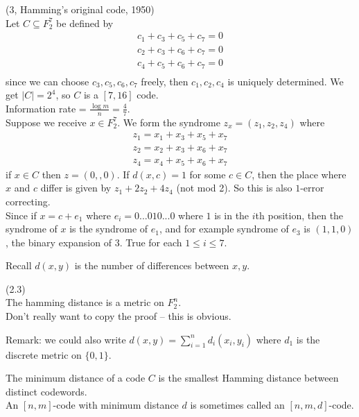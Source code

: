 \documentclass[a4paper]{article}
\begin{document}
\begin{eg} (3, Hamming's original code, 1950)\\
Let $C \subseteq F_2^7$ be defined by\\
\begin{equation*}
\begin{aligned}
c_1+c_3+c_5+c_7=0\\
c_2+c_3+c_6+c_7=0\\
c_4+c_5+c_6+c_7=0\\
\end{aligned}
\end{equation*}
since we can choose $c_3,c_5,c_6,c_7$ freely, then $c_1,c_2,c_4$ is uniquely determined. We get $|C| = 2^4$, so $C$ is a $[7,16]$ code.\\
Information rate = $\frac{\log m}{n} = \frac{4}{7}$.\\
Suppose we receive $x \in F_2^7$. We form the syndrome $z_x = (z_1,z_2,z_4)$ where
\begin{equation*}
\begin{aligned}
z_1=x_1+x_3+x_5+x_7\\
z_2=x_2+x_3+x_6+x_7\\
z_4=x_4+x_5+x_6+x_7
\end{aligned}
\end{equation*}
if $x \in C$ then $z=(0,,0)$. If $d(x,c)=1$ for some $c \in C$, then the place where $x$ and $c$ differ is given by $z_1+2z_2+4z_4$ (not mod 2). So this is also $1$-error correcting.\\
Since if $x=c+e_1$ where $e_i = 0...010...0$ where $1$ is in the $i$th position, then the syndrome of $x$ is the syndrome of $e_1$, and for example syndrome of $e_3$ is $(1,1,0)$, the binary expansion of $3$. True for each $1 \leq i \leq 7$.
\end{eg}

Recall $d(x,y)$ is the number of differences between $x, y$.

\begin{lemma} (2.3)\\
The hamming distance is a metric on $F_2^n$.\\
Don't really want to copy the proof -- this is obvious.
\end{lemma}

Remark: we could also write $d(x,y) = \sum_{i=1}^n d_i (x_i,y_i)$ where $d_1$ is the discrete metric on $\{0,1\}$.

\begin{defi}
The minimum distance of a code $C$ is the smallest Hamming distance between distinct codewords.\\
An $[n,m]$-code with minimum distance $d$ is sometimes called an $[n,m,d]$-code.
\end{defi}
\end{document}

